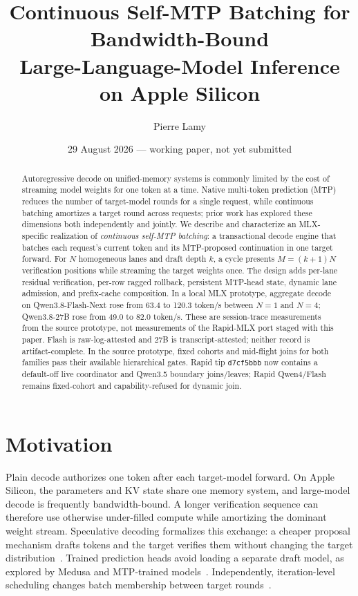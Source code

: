 \documentclass[10pt,twocolumn]{article}
\title{Continuous Self-MTP Batching for Bandwidth-Bound\\
       Large-Language-Model Inference on Apple Silicon}
\author{Pierre Lamy}
\date{29 August 2026 --- working paper, not yet submitted}
\begin{document}
\maketitle

\begin{abstract}
Autoregressive decode on unified-memory systems is commonly limited by the
cost of streaming model weights for one token at a time.  Native multi-token
prediction (MTP) reduces the number of target-model rounds for a single
request, while continuous batching amortizes a target round across requests;
prior work has explored these dimensions both independently and jointly.  We
describe and characterize an MLX-specific realization of \emph{continuous
self-MTP batching}: a transactional decode engine that batches each request's
current token and its MTP-proposed continuation in one target forward.  For
$N$ homogeneous lanes and draft depth $k$, a cycle presents $M=(k+1)N$
verification positions while streaming the target weights once.  The design
adds per-lane residual verification, per-row ragged rollback, persistent
MTP-head state, dynamic lane admission, and prefix-cache composition.  In a
local MLX prototype, aggregate decode on
Qwen3.8-Flash-Next rose from 63.4 to 120.3 token/s between $N=1$ and $N=4$;
Qwen3.8-27B rose from 49.0 to 82.0 token/s.  These are session-trace
measurements from the source prototype, not measurements of the Rapid-MLX
port staged with this paper.  Flash is raw-log-attested and 27B is
transcript-attested; neither record is artifact-complete.  In the source
prototype, fixed cohorts and mid-flight joins for both families pass their
available hierarchical gates.  Rapid tip \texttt{d7cf5bbb} now contains a
default-off live coordinator and Qwen3.5 boundary joins/leaves; Rapid
Qwen4/Flash remains fixed-cohort and capability-refused for dynamic join.
\end{abstract}

\section{Motivation}
Plain decode authorizes one token after each target-model forward.  On Apple
Silicon, the parameters and KV state share one memory system, and large-model
decode is frequently bandwidth-bound.  A longer verification sequence can
therefore use otherwise under-filled compute while amortizing the dominant
weight stream.  Speculative decoding formalizes this exchange: a cheaper
proposal mechanism drafts tokens and the target verifies them without changing
the target distribution~\cite{leviathan2023}.  Trained prediction heads avoid
loading a separate draft model, as explored by Medusa and MTP-trained
models~\cite{cai2024,deepseek2024}.  Independently, iteration-level scheduling
changes batch membership between target rounds~\cite{yu2022}.
\end{document}
